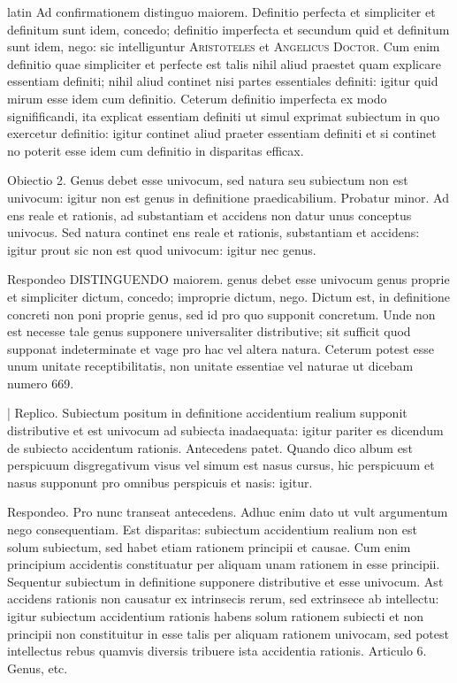 \begin{otherlanguage*}{latin}
\pstart
 Ad confirmationem distinguo maiorem. Definitio perfecta et simpliciter et definitum sunt idem, concedo; definitio imperfecta et secundum quid et definitum sunt idem, nego: sic intelliguntur \textsc{Aristoteles} et \textsc{Angelicus Doctor}. Cum enim definitio quae simpliciter et perfecte est talis nihil aliud praestet quam explicare essentiam definiti; nihil aliud continet nisi partes essentiales definiti: igitur quid mirum esse idem cum definitio. Ceterum definitio imperfecta ex modo signifificandi, ita explicat essentiam definiti ut simul exprimat subiectum in quo exercetur definitio: igitur continet aliud praeter essentiam definiti et si continet no poterit esse idem cum definitio in disparitas efficax. 
\pend

\pstart
 Obiectio 2. Genus debet esse univocum, sed natura seu subiectum non est  univocum: igitur non est genus in definitione praedicabilium. Probatur minor. Ad ens reale et rationis, ad substantiam et accidens non datur unus conceptus univocus. Sed natura continet ens reale et rationis, substantiam et accidens: igitur prout sic non est quod univocum: igitur nec genus. 
\pend

\pstart
 Respondeo DISTINGUENDO maiorem. genus debet esse univocum genus proprie et simpliciter dictum, concedo; improprie dictum, nego. Dictum est, in definitione concreti non poni proprie genus, sed id pro quo supponit concretum. Unde non est necesse tale genus supponere universaliter distributive; sit sufficit quod supponat indeterminate et vage pro hac vel altera natura. Ceterum potest esse unum unitate receptibilitatis, non unitate essentiae vel naturae ut dicebam numero 669. 
\pend

\pstart
 \textnormal{|}   Replico. Subiectum positum in definitione accidentium realium supponit distributive et est univocum ad subiecta inadaequata: igitur pariter es dicendum de subiecto accidentum rationis. Antecedens patet. Quando dico album est perspicuum disgregativum visus vel simum est nasus cursus, hic perspicuum et nasus supponunt pro omnibus perspicuis et nasis: igitur. 
\pend

\pstart
 Respondeo. Pro nunc transeat antecedens. Adhuc enim dato ut vult argumentum nego consequentiam. Est disparitas: subiectum accidentium realium non est solum subiectum, sed habet etiam rationem principii et causae. Cum enim principium accidentis constituatur per aliquam unam rationem in esse principii. Sequentur subiectum in definitione supponere distributive et esse univocum. Ast accidens rationis non causatur ex intrinsecis rerum, sed extrinsece ab intellectu: igitur subiectum accidentium rationis habens solum rationem subiecti et non principii non constituitur in esse talis per aliquam rationem univocam, sed potest intellectus rebus quamvis diversis tribuere ista accidentia rationis. Articulo 6. Genus, etc.  
\pend


\end{otherlanguage*}
